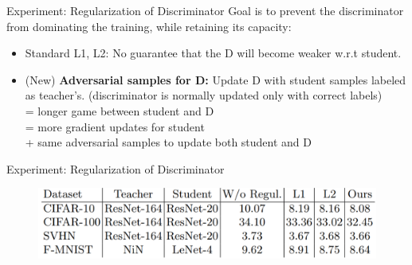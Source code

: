 \documentclass{beamer}
\begin{document}
\begin{frame}{Experiment: Regularization of Discriminator}
Goal is to prevent the discriminator
from dominating the training, while retaining its capacity:
\begin{itemize}
\item Standard L1, L2: No guarantee that the D will become weaker w.r.t student.
\item (New) \textbf{Adversarial samples for D:} Update D with student samples labeled as teacher's. (discriminator is normally updated only with correct labels) \\
= longer game between student and D \\
= more gradient updates for student \\
+ same adversarial samples to update both student and D 
\end{itemize}



\end{frame}
\begin{frame}{Experiment: Regularization of Discriminator}

\begin{figure}[h]
\includegraphics[scale=0.45]{img/regularization}
\end{figure}

\end{frame}
\end{document}
